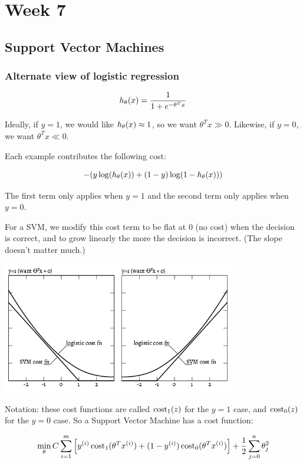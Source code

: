 \chapter{Week 7}

\section{Support Vector Machines}

\subsection{Alternate view of logistic regression}

\[ h_\theta(x) = \frac{1}{1 + e^{-\theta^T x}} \]

Ideally, if $y=1$, we would like $h_\theta(x) \approx 1$, so we want $\theta^T x \gg 0$.
Likewise, if $y=0$, we want $\theta^T x \ll 0$.

Each example contributes the following cost:

\[ - \qty( y \log(h_\theta(x)) + (1-y)\log(1-h_\theta(x)) ) \]

The first term only applies when $y=1$ and the second term only applies when $y=0$.

For a SVM, we modify this cost term to be
flat at 0 (no cost) when the decision is correct,
and to grow linearly the more the decision is incorrect.
(The slope doesn't matter much.)

\begin{center}
\includegraphics[width=4in]{images/svm-cost-function.png}
\end{center}

Notation: these cost functions are called $\operatorname{cost}_1(z)$ for the $y=1$ case,
and $\operatorname{cost}_0(z)$ for the $y=0$ case.
So a Support Vector Machine has a cost function:

\[ 
    \min_\theta C 
    \sum_{i=1}^m \qty[
        y_{}^{(i)} \operatorname{cost}_1(\theta^T x_{}^{(i)}) + 
        (1-y_{}^{(i)}) \operatorname{cost}_0(\theta^T x_{}^{(i)}) 
    ]
    + \frac{1}{2} \sum_{j=0}^n \theta_j^2
\]


